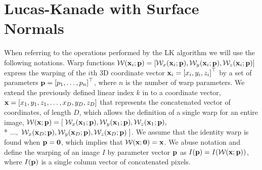 \section{Lucas-Kanade with Surface Normals}\label{sec:singl_imag_lk}
When referring to the operations performed by the LK algorithm we will use the
following notations. Warp functions
$\mathcal{W}(\boldsymbol{\mathbf{x}}_i;\boldsymbol{\mathbf{p}}) = \left[\mathcal{W}_x(\boldsymbol{\mathbf{x}}_i;\boldsymbol{\mathbf{p}}), \mathcal{W}_y(\boldsymbol{\mathbf{x}}_i;\boldsymbol{\mathbf{p}}),\mathcal{W}_z(\boldsymbol{\mathbf{x}}_i;\boldsymbol{\mathbf{p}}) \right]$ 
express the warping of the $i$th 3D
coordinate vector $\boldsymbol{\mathbf{x}}_i = {[x_i, y_i, z_i]}^{\top}$ by a set of parameters
$\boldsymbol{\mathbf{p}} = {\left[p_1, \ldots, p_n\right]}^{\top}$, where $n$ is the number of warp
parameters. We extend the previously defined linear index $k$ in to a coordinate
vector, $\boldsymbol{\mathbf{x}} = \left[ x_1, y_1, z_1, \ldots, x_D, y_D, z_D \right]$ that
represents the concatenated vector of coordinates, of length $D$, which allows
the definition of a single warp for an entire image,
$\mathcal{W}(\boldsymbol{\mathbf{x}};\boldsymbol{\mathbf{p}}) = \left[\right. \mathcal{W}_x(\boldsymbol{\mathbf{x}}_1;\boldsymbol{\mathbf{p}}), \mathcal{W}_y(\boldsymbol{\mathbf{x}}_1;\boldsymbol{\mathbf{p}}), \mathcal{W}_z(\boldsymbol{\mathbf{x}}_1;\boldsymbol{\mathbf{p}}),$ \\* $\ldots,$ $\mathcal{W}_x(\boldsymbol{\mathbf{x}}_D;\boldsymbol{\mathbf{p}}), \mathcal{W}_y(\boldsymbol{\mathbf{x}}_D;\boldsymbol{\mathbf{p}}), \mathcal{W}_z(\boldsymbol{\mathbf{x}}_D;\boldsymbol{\mathbf{p}}) \left.\right]$.
We assume that the identity warp is found when $\boldsymbol{\mathbf{p}} = \boldsymbol{\mathbf{0}}$, which implies that
$\mathcal{W}(\boldsymbol{\mathbf{x}};\boldsymbol{\mathbf{0}}) = \boldsymbol{\mathbf{x}}$. We abuse notation and define the
warping of an image $I$ by parameter vector $\boldsymbol{\mathbf{p}}$ as $I(\boldsymbol{\mathbf{p}}) = I(\mathcal{W}(\boldsymbol{\mathbf{x}};\boldsymbol{\mathbf{p}}))$,
where $I(\boldsymbol{\mathbf{p}})$ is a single column vector of concatenated pixels.
